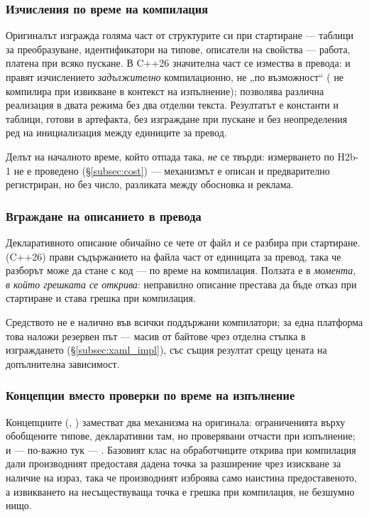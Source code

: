 \subsubsection{Изчисления по време на компилация}

Оригиналът изгражда голяма част от структурите си при стартиране --- таблици за
преобразуване, идентификатори на типове, описатели на свойства --- работа, платена при
всяко пускане. В C++26 значителна част се измества в превода:  и
 правят изчислението \emph{задължително} компилационно, не „по
възможност“ ( не компилира при извикване в контекст на изпълнение);
 позволява различна реализация в двата режима без два отделни текста.
Резултатът е  константи и таблици, готови в артефакта, без
изграждане при пускане и без неопределения ред на инициализация между единиците за превод.

Делът на началното време, който отпада така, \emph{не} се твърди: измерването по H2b-1 не е
проведено (§\ref{subsec:cost}) --- механизмът е описан и предварително регистриран, но без
число, разликата между обосновка и реклама.

\subsubsection{Вграждане на описанието в превода}

Декларативното описание обичайно се чете от файл и се разбира при стартиране.
 (C++26) прави съдържанието на файла част от единицата за превод, така че
разборът може да стане с  код --- по време на компилация. Ползата е в
\emph{момента, в който грешката се открива}: неправилно описание престава да бъде отказ
при стартиране и става грешка при компилация.

Средството не е налично във всички поддържани компилатори; за една платформа това наложи
резервен път --- масив от байтове чрез отделна стъпка в изграждането
(§\ref{subsec:xaml_impl}), със същия резултат срещу цената на допълнителна зависимост.

\subsubsection{Концепции вместо проверки по време на изпълнение}

Концепциите (, ) заместват два механизма на оригинала:
ограниченията върху обобщените типове, декларативни там, но проверявани отчасти при
изпълнение; и --- по-важно тук --- . Базовият
клас на обработчиците открива при компилация дали производният предоставя дадена точка за
разширение чрез изискване за наличие на израз, така че производният изброява само
наистина предоставеното, а извикването на несъществуваща точка е грешка при компилация, не
безшумно нищо.

